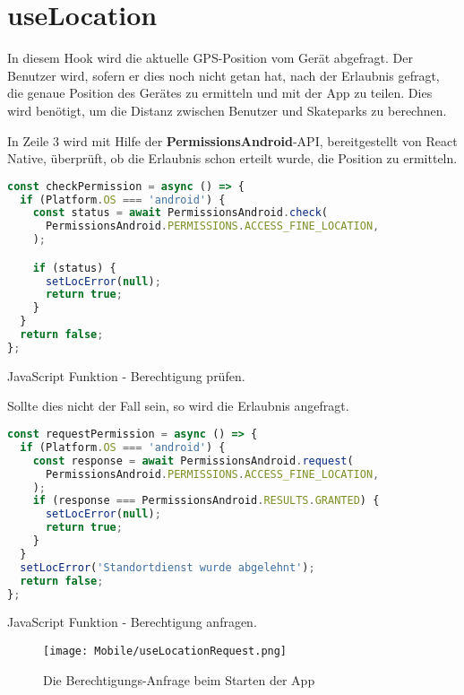 \section{useLocation}
In diesem Hook wird die aktuelle GPS-Position vom Gerät abgefragt. Der Benutzer wird, sofern er dies
noch nicht getan hat, nach der Erlaubnis gefragt, die genaue Position des Gerätes zu ermitteln und
mit der App zu teilen. Dies wird benötigt, um die Distanz zwischen Benutzer und Skateparks zu
berechnen.

In Zeile 3 wird mit Hilfe der \textbf{PermissionsAndroid}-API, bereitgestellt von React Native, überprüft,
ob die Erlaubnis schon erteilt wurde, die Position zu ermitteln.

\begin{code}[htp]
\begin{lstlisting}[firstnumber=1,language=JavaScript, style=JSX]
const checkPermission = async () => {
  if (Platform.OS === 'android') {
    const status = await PermissionsAndroid.check(
      PermissionsAndroid.PERMISSIONS.ACCESS_FINE_LOCATION,
    );

    if (status) {
      setLocError(null);
      return true;
    }
  }
  return false;
};
\end{lstlisting}
\caption{JavaScript Funktion - Berechtigung prüfen.}
\end{code}

Sollte dies nicht der Fall sein, so wird die Erlaubnis angefragt.

\begin{code}[htp]
\begin{lstlisting}[firstnumber=1,language=JavaScript, style=JSX]
const requestPermission = async () => {
  if (Platform.OS === 'android') {
    const response = await PermissionsAndroid.request(
      PermissionsAndroid.PERMISSIONS.ACCESS_FINE_LOCATION,
    );
    if (response === PermissionsAndroid.RESULTS.GRANTED) {
      setLocError(null);
      return true;
    }
  }
  setLocError('Standortdienst wurde abgelehnt');
  return false;
};
\end{lstlisting}
\caption{JavaScript Funktion - Berechtigung anfragen.}
\end{code}


\begin{figure}[H]
  \begin{center}
    \texttt{[image: Mobile/useLocationRequest.png]}
    \caption{Die Berechtigungs-Anfrage beim Starten der App}
  \end{center}
\end{figure}

